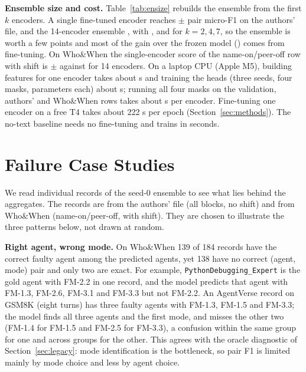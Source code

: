 \documentclass[conference]{IEEEtran}
\begin{document}
\textbf{Ensemble size and cost.} Table~\ref{tab:ensize} rebuilds the ensemble from the first $k$ encoders. A single fine-tuned encoder reaches \ensSingleAE{} $\pm$ \ensSingleAEsd{} pair micro-F1 on the authors' file, and the 14-encoder ensemble \ensKfourteenAE{}, with \ensKtwoAE{}, \ensKfourAE{} and \ensKsevenAE{} for $k=2,4,7$, so the ensemble is worth a few points and most of the gain over the frozen model (\fullAEdedup) comes from fine-tuning. On Who\&When the single-encoder score of the name-on/peer-off row with shift is \ensSingleWWshift{} $\pm$ \ensSingleWWshiftSd{} against \ensFourteenWWshift{} for 14 encoders. On a laptop CPU (Apple M5), building features for one encoder takes about \costFeat{} s and training the heads (three seeds, four masks, \costParams{} parameters each) about \costHead{} s; running all four masks on the validation, authors' and Who\&When rows takes about \costInf{} s per encoder. Fine-tuning one encoder on a free T4 takes about 222 s per epoch (Section~\ref{sec:methods}). The no-text baseline needs no fine-tuning and trains in seconds.



\section{Failure Case Studies}\label{sec:cases}
We read individual records of the seed-0 ensemble to see what lies behind the aggregates. The records are from the authors' file (all blocks, no shift) and from Who\&When (name-on/peer-off, with shift). They are chosen to illustrate the three patterns below, not drawn at random.

\textbf{Right agent, wrong mode.} On Who\&When 139 of 184 records have the correct faulty agent among the predicted agents, yet 138 have no correct (agent, mode) pair and only two are exact. For example, \texttt{PythonDebugging\_Expert} is the gold agent with FM-2.2 in one record, and the model predicts that agent with FM-1.3, FM-2.6, FM-3.1 and FM-3.3 but not FM-2.2. An AgentVerse record on GSM8K (eight turns) has three faulty agents with FM-1.3, FM-1.5 and FM-3.3; the model finds all three agents and the first mode, and misses the other two (FM-1.4 for FM-1.5 and FM-2.5 for FM-3.3), a confusion within the same group for one and across groups for the other. This agrees with the oracle diagnostic of Section~\ref{sec:legacy}: mode identification is the bottleneck, so pair F1 is limited mainly by mode choice and less by agent choice.
\end{document}
